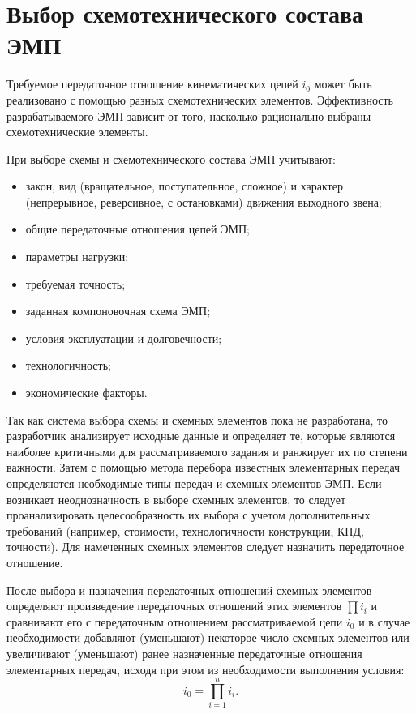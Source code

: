 \documentclass{tufte-book}
\begin{document}
\section{Выбор схемотехнического состава ЭМП}
Требуемое передаточное отношение кинематических цепей $ i_0 $ может быть реализовано с помощью разных схемотехнических элементов.
Эффективность разрабатываемого ЭМП зависит от того, насколько рационально выбраны схемотехнические элементы.

При выборе схемы и схемотехнического состава ЭМП учитывают: 
\begin{itemize}
	\item закон, вид (вращательное, поступательное, сложное) и характер (непрерывное, реверсивное, с остановками) движения выходного звена;
	\item общие передаточные отношения цепей ЭМП;
	\item параметры нагрузки;
	\item требуемая точность;
	\item заданная компоновочная схема ЭМП;
	\item условия эксплуатации и долговечности;
	\item технологичность;
	\item экономические факторы.
\end{itemize}

Так как система выбора схемы и схемных элементов пока не разработана, то разработчик анализирует исходные данные и определяет те, которые являются наиболее критичными для рассматриваемого задания и ранжирует их по степени важности.
Затем с помощью метода перебора известных элементарных передач определяются необходимые типы передач и схемных элементов ЭМП.
Если возникает неоднозначность в выборе схемных элементов, то следует проанализировать целесообразность их выбора с учетом дополнительных требований (например, стоимости, технологичности конструкции, КПД, точности). 
Для намеченных схемных элементов следует назначить передаточное отношение.

После выбора и назначения передаточных отношений схемных элементов определяют произведение передаточных отношений этих элементов $ \prod{i_i} $ и сравнивают его с передаточным отношением рассматриваемой цепи $ i_0 $ и в случае необходимости добавляют (уменьшают) некоторое число схемных элементов или увеличивают (уменьшают) ранее назначенные передаточные отношения элементарных передач, исходя при этом из необходимости выполнения условия:
\begin{equation*}
i_0 = \prod_{i=1}^{n}i_i.
\end{equation*}
\end{document}

